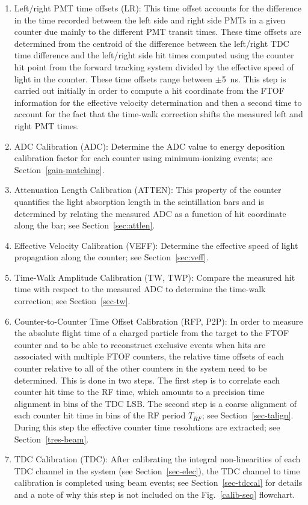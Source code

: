 \documentclass[3p,times,twocolumn]{elsarticle}
\begin{document}
\begin{enumerate}
\item Left/right PMT time offsets (LR): This time offset accounts for the difference in the time recorded
between the left side and right side PMTs in a given counter due mainly to the different PMT transit times.
These time offsets are determined from the centroid of the difference between the left/right TDC time
difference and the left/right side hit times computed using the counter hit point from the forward tracking
system divided by the effective speed of light in the counter. These time offsets range between $\pm$5~ns.
This step is carried out initially in order to compute a hit coordinate from the FTOF information for the
effective velocity determination and then a second time to account for the fact that the time-walk correction
shifts the measured left and right PMT times.

\item ADC Calibration (ADC): Determine the ADC value to energy deposition calibration factor for each counter
using minimum-ionizing events; see Section~\ref{gain-matching}.

\item Attenuation Length Calibration (ATTEN): This property of the counter quantifies the light absorption
length in the scintillation bars and is determined by relating the measured ADC as a function of hit coordinate
along the bar; see Section~\ref{sec:attlen}.

\item Effective Velocity Calibration (VEFF): Determine the effective speed of light propagation along the counter;
see Section~\ref{sec:veff}.

\item Time-Walk Amplitude Calibration (TW, TWP): Compare the measured hit time with respect to the measured
ADC to determine the time-walk correction; see Section~\ref{sec-tw}.
  
\item Counter-to-Counter Time Offset Calibration (RFP, P2P): In order to measure the absolute flight time of a
charged particle from the target to the FTOF counter and to be able to reconstruct exclusive events when hits
are associated with multiple FTOF counters, the relative time offsets of each counter relative to all of the other
counters in the system need to be determined. This is done in two steps. The first step is to correlate each counter
hit time to the RF time, which amounts to a precision time alignment in bins of the TDC LSB. The second step is a
coarse alignment of each counter hit time in bins of the RF period $T_{RF}$; see Section~\ref{sec-talign}. During
this step the effective counter time resolutions are extracted; see Section~\ref{tres-beam}.

\item TDC Calibration (TDC): After calibrating the integral non-linearities of each TDC channel in the system
(see Section~\ref{sec-elec}), the TDC channel to time calibration is completed using beam events; see
Section~\ref{sec-tdccal} for details and a note of why this step is not included on the Fig.~\ref{calib-seq}
flowchart.

\end{enumerate}
\end{document}
